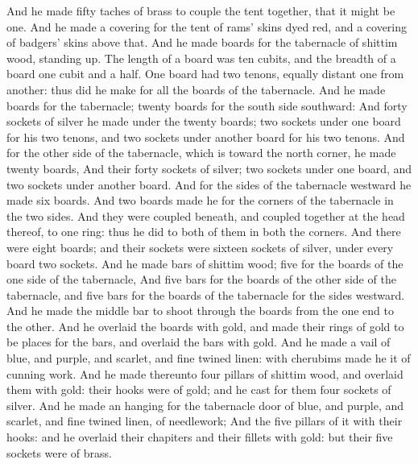 \begin{biblechapter}
\verse And he made fifty taches of brass to couple the tent together, that it might be one.
\verse And he made a covering for the tent of rams' skins dyed red, and a covering of badgers' skins above that.
\verse And he made boards for the tabernacle of shittim wood, standing up.
\verse The length of a board was ten cubits, and the breadth of a board one cubit and a half.
\verse One board had two tenons, equally distant one from another: thus did he make for all the boards of the tabernacle.
\verse And he made boards for the tabernacle; twenty boards for the south side southward:
\verse And forty sockets of silver he made under the twenty boards; two sockets under one board for his two tenons, and two sockets under another board for his two tenons.
\verse And for the other side of the tabernacle, which is toward the north corner, he made twenty boards,
\verse And their forty sockets of silver; two sockets under one board, and two sockets under another board.
\verse And for the sides of the tabernacle westward he made six boards.
\verse And two boards made he for the corners of the tabernacle in the two sides.
\verse And they were coupled beneath, and coupled together at the head thereof, to one ring: thus he did to both of them in both the corners.
\verse And there were eight boards; and their sockets were sixteen sockets of silver, under every board two sockets.
\verse And he made bars of shittim wood; five for the boards of the one side of the tabernacle,
\verse And five bars for the boards of the other side of the tabernacle, and five bars for the boards of the tabernacle for the sides westward.
\verse And he made the middle bar to shoot through the boards from the one end to the other.
\verse And he overlaid the boards with gold, and made their rings of gold to be places for the bars, and overlaid the bars with gold.
\verse And he made a vail of blue, and purple, and scarlet, and fine twined linen: with cherubims made he it of cunning work.
\verse And he made thereunto four pillars of shittim wood, and overlaid them with gold: their hooks were of gold; and he cast for them four sockets of silver.
\verse And he made an hanging for the tabernacle door of blue, and purple, and scarlet, and fine twined linen, of needlework;
\verse And the five pillars of it with their hooks: and he overlaid their chapiters and their fillets with gold: but their five sockets were of brass.
\end{biblechapter}

